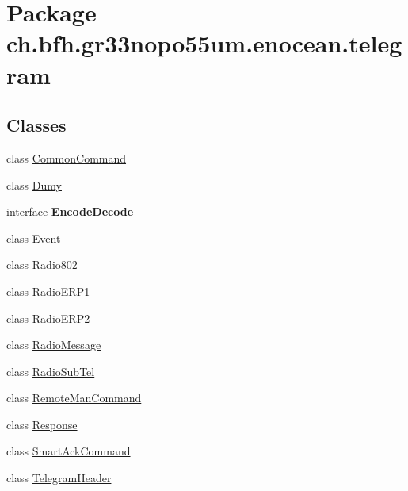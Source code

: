 \hypertarget{namespacech_1_1bfh_1_1gr33nopo55um_1_1enocean_1_1telegram}{}\section{Package ch.\+bfh.\+gr33nopo55um.\+enocean.\+telegram}
\label{namespacech_1_1bfh_1_1gr33nopo55um_1_1enocean_1_1telegram}
\subsection*{Classes}
\begin{DoxyCompactItemize}
\item 
class \hyperlink{classch_1_1bfh_1_1gr33nopo55um_1_1enocean_1_1telegram_1_1_common_command}{Common\+Command}
\item 
class \hyperlink{classch_1_1bfh_1_1gr33nopo55um_1_1enocean_1_1telegram_1_1_dumy}{Dumy}
\item 
interface {\bfseries Encode\+Decode}
\item 
class \hyperlink{classch_1_1bfh_1_1gr33nopo55um_1_1enocean_1_1telegram_1_1_event}{Event}
\item 
class \hyperlink{classch_1_1bfh_1_1gr33nopo55um_1_1enocean_1_1telegram_1_1_radio802}{Radio802}
\item 
class \hyperlink{classch_1_1bfh_1_1gr33nopo55um_1_1enocean_1_1telegram_1_1_radio_e_r_p1}{Radio\+E\+R\+P1}
\item 
class \hyperlink{classch_1_1bfh_1_1gr33nopo55um_1_1enocean_1_1telegram_1_1_radio_e_r_p2}{Radio\+E\+R\+P2}
\item 
class \hyperlink{classch_1_1bfh_1_1gr33nopo55um_1_1enocean_1_1telegram_1_1_radio_message}{Radio\+Message}
\item 
class \hyperlink{classch_1_1bfh_1_1gr33nopo55um_1_1enocean_1_1telegram_1_1_radio_sub_tel}{Radio\+Sub\+Tel}
\item 
class \hyperlink{classch_1_1bfh_1_1gr33nopo55um_1_1enocean_1_1telegram_1_1_remote_man_command}{Remote\+Man\+Command}
\item 
class \hyperlink{classch_1_1bfh_1_1gr33nopo55um_1_1enocean_1_1telegram_1_1_response}{Response}
\item 
class \hyperlink{classch_1_1bfh_1_1gr33nopo55um_1_1enocean_1_1telegram_1_1_smart_ack_command}{Smart\+Ack\+Command}
\item 
class \hyperlink{classch_1_1bfh_1_1gr33nopo55um_1_1enocean_1_1telegram_1_1_telegram_header}{Telegram\+Header}
\end{DoxyCompactItemize}
